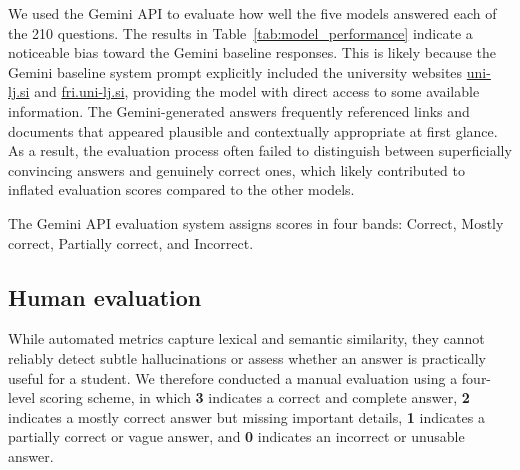 \documentclass[fleqn,moreauthors,10pt]{ds_report}
\begin{document}
We used the Gemini API to evaluate how well the five models answered each of the 210 questions. The results in Table~\ref{tab:model_performance} indicate a noticeable bias toward the Gemini baseline responses. This is likely because the Gemini baseline system prompt explicitly included the university websites \href{https://www.uni-lj.si/}{uni-lj.si} and \href{https://fri.uni-lj.si/}{fri.uni-lj.si}, providing the model with direct access to some available information. The Gemini-generated answers frequently referenced links and documents that appeared plausible and contextually appropriate at first glance. As a result, the evaluation process often failed to distinguish between superficially convincing answers and genuinely correct ones, which likely contributed to inflated evaluation scores compared to the other models.

The Gemini API evaluation system assigns scores in four bands: Correct, Mostly correct, Partially correct, and Incorrect.


\begin{table}[h]
\centering
\small
{}
\caption{Performance comparison across models in percentages, indicating a clear bias towards the Gemini baseline.}
\label{tab:model_performance}
\end{table}


\subsection*{Human evaluation}

While automated metrics capture lexical and semantic similarity,
they cannot reliably detect subtle hallucinations or assess whether
an answer is practically useful for a student. We therefore conducted
a manual evaluation using a four-level scoring scheme, in which \textbf{3} indicates a correct and complete answer, \textbf{2} indicates a mostly correct answer but missing important details, \textbf{1} indicates a partially correct or vague answer, and \textbf{0} indicates an incorrect or unusable answer.
\end{document}
